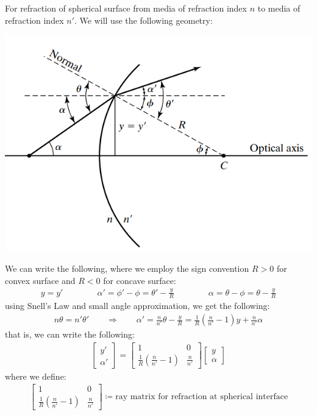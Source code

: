 \documentclass[11pt]{book}
\theoremstyle{break}
\theoremstyle{break}
\newcommand{\bmat}[1]{\begin{bmatrix} #1 \end{bmatrix}}
\begin{document}
For refraction of spherical surface from media of refraction index $n$ to media of refraction index $n'$. We will use the following geometry:
\begin{center}
\includegraphics[scale=0.55]{refracM.png}
\end{center}
We can write the following, where we employ the sign convention $R>0$ for convex surface and $R<0$ for concave surface:
\begin{align*}
y=y' \qquad\qquad \alpha' = \phi' - \phi = \theta ' -\frac{y}{R} \qquad\qquad \alpha = \theta - \phi = \theta - \frac{y}{R}
\end{align*}
using Snell's Law and small angle approximation, we get the following:
\begin{align*}
n \theta = n'\theta' \qquad \Rightarrow \qquad \alpha'=\frac{n}{n'}\theta - \frac{y}{R} = \frac{1}{R}\left(\frac{n}{n'}-1\right) y + \frac{n}{n'}\alpha
\end{align*}
that is, we can write the following:
\begin{align*}
\bmat{y' \\ \alpha'} = \bmat{1 & 0 \\ \frac{1}{R}\left( \frac{n}{n'}-1\right) & \frac{n}{n'}}\bmat{y\\\alpha}
\end{align*}
where we define:
\begin{align*}
 \bmat{1 & 0 \\ \frac{1}{R}\left( \frac{n}{n'}-1\right) & \frac{n}{n'}} \coloneqq \text{ray matrix for refraction at spherical interface}
\end{align*}
\hfill\break
\end{document}
